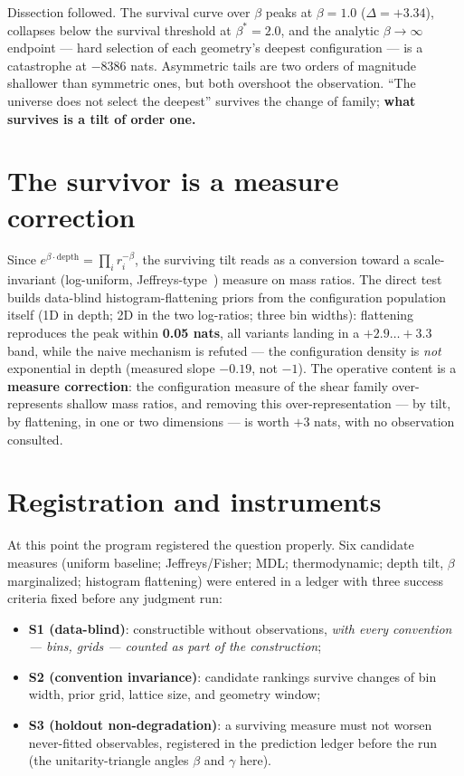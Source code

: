\documentclass[aps,prd,preprint,nofootinbib]{revtex4-2}
\begin{document}
Dissection followed. The survival curve over $\beta$ peaks at $\beta=1.0$
($\Delta=+3.34$), collapses below the survival threshold at $\beta^*=2.0$, and
the analytic $\beta\to\infty$ endpoint --- hard selection of each geometry's
deepest configuration --- is a catastrophe at $-8386$ nats. Asymmetric tails
are two orders of magnitude shallower than symmetric ones, but both overshoot
the observation. ``The universe does not select the deepest'' survives the
change of family; \textbf{what survives is a tilt of order one.}

\section{The survivor is a measure correction}

Since $e^{\beta\cdot\mathrm{depth}}=\prod_i r_i^{-\beta}$, the surviving tilt
reads as a conversion toward a scale-invariant (log-uniform,
Jeffreys-type~\cite{Jeffreys}) measure on mass ratios. The direct test builds
data-blind histogram-flattening priors from the configuration population itself
(1D in depth; 2D in the two log-ratios; three bin widths): flattening
reproduces the peak within \textbf{0.05 nats}, all variants landing in a
$+2.9\ldots+3.3$ band, while the naive mechanism is refuted --- the
configuration density is \emph{not} exponential in depth (measured slope
$-0.19$, not $-1$). The operative content is a \textbf{measure correction}: the
configuration measure of the shear family over-represents shallow mass ratios,
and removing this over-representation --- by tilt, by flattening, in one or two
dimensions --- is worth $+3$ nats, with no observation consulted.

\section{Registration and instruments}

At this point the program registered the question properly. Six candidate
measures (uniform baseline; Jeffreys/Fisher; MDL; thermodynamic; depth tilt,
$\beta$ marginalized; histogram flattening) were entered in a ledger with three
success criteria fixed before any judgment run:
\begin{itemize}
\item \textbf{S1 (data-blind)}: constructible without observations, \emph{with
      every convention --- bins, grids --- counted as part of the
      construction};
\item \textbf{S2 (convention invariance)}: candidate rankings survive changes
      of bin width, prior grid, lattice size, and geometry window;
\item \textbf{S3 (holdout non-degradation)}: a surviving measure must not
      worsen never-fitted observables, registered in the prediction ledger
      before the run (the unitarity-triangle angles $\beta$ and $\gamma$ here).
\end{itemize}
\end{document}
